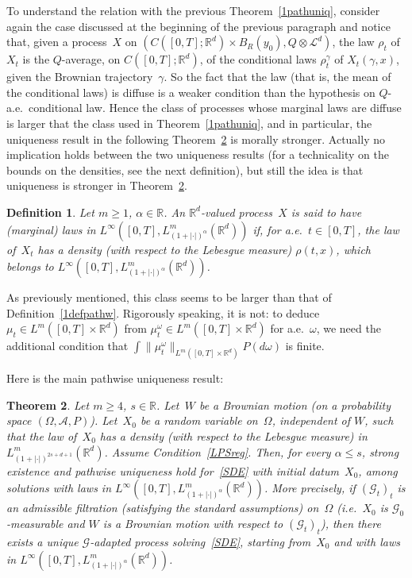 \documentclass[a4paper,10pt]{article}
\newtheorem{theorem}{Theorem}[section]
\newtheorem{definition}[theorem]{Definition}
\newcommand\1{\mathbbm{1}}
\newcommand{\mc}{\mathcal}
\numberwithin{equation}{section}
\begin{document}
To understand the relation with the previous Theorem~\ref{1pathuniq}, consider again the case discussed at the beginning of the previous paragraph and notice that, given a process~$X$ on $(C([0,T];\mathbb{R}^d)\times B_R(y_0),Q\otimes\mc{L}^d)$, the law $\rho_t$ of~$X_t$ is the $Q$-average, on $C([0,T];\mathbb{R}^d)$, of the conditional laws $\rho^\gamma_t$ of $X_t(\gamma,x)$, given the Brownian trajectory~$\gamma$. So the fact that the law (that is, the mean of the conditional laws) is diffuse is a weaker condition than the hypothesis on $Q$-a.e.~conditional law. Hence the class of processes whose marginal laws are diffuse is larger that the class used in Theorem~\ref{1pathuniq}, and in particular, the uniqueness result in the following Theorem~\ref{2pathwise} is morally stronger. Actually no implication holds between the two uniqueness results (for a technicality on the bounds on the densities, see the next definition), but still the idea is that uniqueness is stronger in Theorem~\ref{2pathwise}.

\begin{definition}
Let $m \geq 1$, $\alpha\in\mathbb{R}$. An $\mathbb{R}^d$-valued process~$X$ is said to have \emph{\textup{(}marginal\textup{)} laws in $L^\infty([0,T],L^m_{(1+|\cdot|)^{\alpha}}(\mathbb{R}^d))$} if, for a.e.~$t \in [0,T]$, the law of~$X_t$ has a density \textup{(}with respect to the Lebesgue measure\textup{)} $\rho(t,x)$, which belongs to $L^\infty([0,T],L^m_{(1+|\cdot|)^{\alpha}}(\mathbb{R}^d))$.
\end{definition}

As previously mentioned, this class seems to be larger than that of Definition~\ref{1defpathw}. Rigorously speaking, it is not: to deduce $\mu_t\in L^m([0,T]\times\mathbb{R}^d)$ from $\mu^\omega_t\in L^m([0,T]\times\mathbb{R}^d)$ for a.e.~$\omega$, we need the additional condition that $\int\|\mu_t^\omega\|_{L^m([0,T]\times\mathbb{R}^d)}P(d\omega)$ is finite.

Here is the main pathwise uniqueness result:

\begin{theorem}\label{2pathwise}
Let $m\ge4$, $s\in\mathbb{R}$. Let~$W$ be a Brownian motion \textup{(}on a probability space $(\Omega,\mc{A},P)$\textup{)}. Let~$X_0$ be a random variable on~$\Omega$, independent of $W$, such that the law of~$X_0$ has a density \textup{(}with respect to the Lebesgue measure\textup{)} in $L^m_{(1+|\cdot|)^{2s+d+1}}(\mathbb{R}^d)$. Assume Condition~\ref{LPSreg}. Then, for every $\alpha\le s$, strong existence and pathwise uniqueness hold for~\eqref{SDE} with initial datum~$X_0$, among solutions with laws in $L^\infty([0,T],L^m_{(1+|\cdot|)^{\alpha}}(\mathbb{R}^d))$. More precisely, if $(\mc{G}_t)_t$ is an admissible filtration \textup{(}satisfying the standard assumptions\textup{)} on~$\Omega$ \textup{(}i.e.~$X_0$ is $\mc{G}_0$-measurable and $W$ is a Brownian motion with respect to $(\mc{G}_t)_t$\textup{)}, then there exists a unique $\mc{G}$-adapted process solving~\eqref{SDE}, starting from~$X_0$ and with laws in $L^\infty([0,T],L^m_{(1+|\cdot|)^{\alpha}}(\mathbb{R}^d))$. 
\end{theorem}
\end{document}
